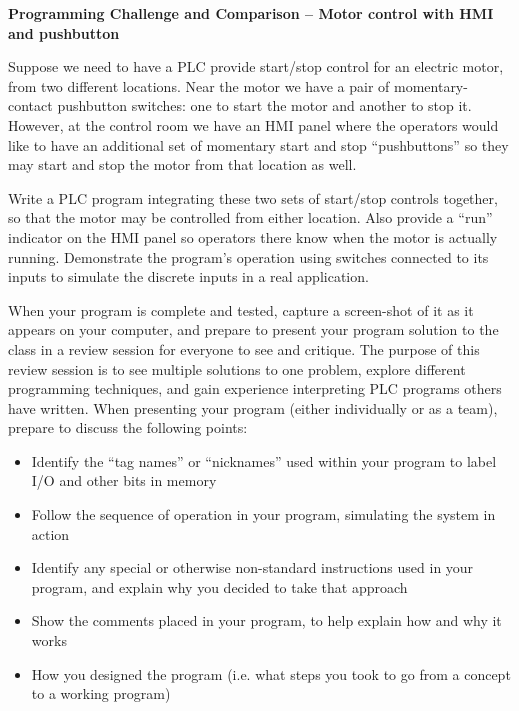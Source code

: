 

\noindent
{\bf Programming Challenge and Comparison -- Motor control with HMI and pushbutton} 

\vskip 10pt

Suppose we need to have a PLC provide start/stop control for an electric motor, from two different locations.  Near the motor we have a pair of momentary-contact pushbutton switches: one to start the motor and another to stop it.  However, at the control room we have an HMI panel where the operators would like to have an additional set of momentary start and stop ``pushbuttons'' so they may start and stop the motor from that location as well.

\vskip 10pt

Write a PLC program integrating these two sets of start/stop controls together, so that the motor may be controlled from either location.  Also provide a ``run'' indicator on the HMI panel so operators there know when the motor is actually running.  Demonstrate the program's operation using switches connected to its inputs to simulate the discrete inputs in a real application.  

\vskip 10pt

When your program is complete and tested, capture a screen-shot of it as it appears on your computer, and prepare to present your program solution to the class in a review session for everyone to see and critique.  The purpose of this review session is to see multiple solutions to one problem, explore different programming techniques, and gain experience interpreting PLC programs others have written.  When presenting your program (either individually or as a team), prepare to discuss the following points:

\begin{itemize}
\item{} Identify the ``tag names'' or ``nicknames'' used within your program to label I/O and other bits in memory
\item{} Follow the sequence of operation in your program, simulating the system in action
\item{} Identify any special or otherwise non-standard instructions used in your program, and explain why you decided to take that approach
\item{} Show the comments placed in your program, to help explain how and why it works
\item{} How you designed the program (i.e. what steps you took to go from a concept to a working program)
\end{itemize}


